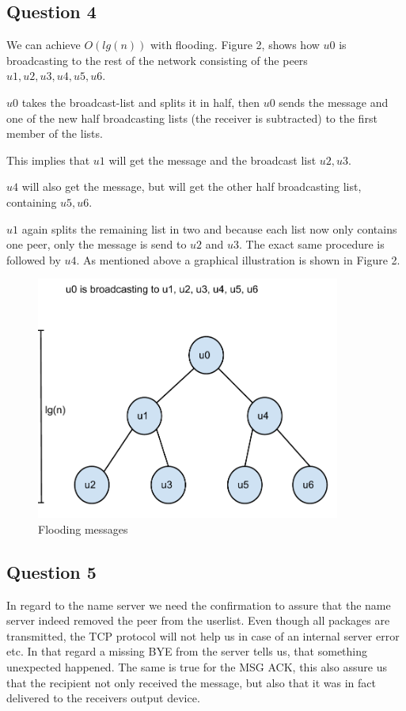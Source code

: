 \subsection{Question 4}
We can achieve $O(lg(n))$ with flooding. Figure 2, shows how $u0$ is
broadcasting to the rest of the network consisting of the peers
$u1,u2,u3,u4,u5,u6$.

$u0$ takes the broadcast-list and splits it in half, then $u0$ sends the
message and one of the new half broadcasting lists (the receiver
is subtracted) to the first member of the lists.

This implies that $u1$ will get the message and the broadcast list $u2, u3$.

$u4$ will also get the message, but will get the other half broadcasting list,
containing  $u5,u6$.

$u1$ again splits the remaining list in two and because each list now only
contains one peer, only the message is send to $u2$ and $u3$. The exact same
procedure is followed by $u4$. As mentioned above a graphical illustration is
shown in Figure 2.

\begin{figure}[!h]
    \centering
    \includegraphics[width=10cm]{graphics/flooding}
    \caption{Flooding messages}
\end{figure}

\subsection{Question 5}
In regard to the name server we need the confirmation to assure that the name
server indeed removed the peer from the userlist. Even though all packages are
transmitted, the TCP protocol will not help us in case of an internal server
error etc. In that regard a missing BYE from the server tells us, that
something unexpected happened.
The same is true for the MSG ACK, this also assure us that the recipient not
only received the message, but also that it was in fact delivered to the
receivers output device.
